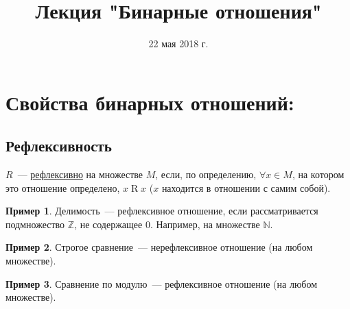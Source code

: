 \documentclass[russian]{lecture-notes}
\title{Лекция "Бинарные отношения"}
\date{22 мая 2018 г.}
\theoremstyle{definition}
\newtheorem{example*}{Пример}[subsection]
\newcommand{\relation}[2]{$#1\mathrel{R}#2$}
\begin{document}
	\maketitle


\section{Свойства бинарных отношений:}

\subsection{Рефлексивность \label{opr:refleks}}
\begin{definition} 
	$R$~--- \underline{рефлексивно} на множестве $M$, если, по определению, $\forall x \in M$, на котором это отношение определено, \relation{x}{x} ($x$ находится в отношении с самим собой).
\end{definition}

\begin{example*}
	Делимость~--- рефлексивное отношение, если рассматривается подмножество $\mathbb{Z}$, не содержащее 0. Например, на множестве $\mathbb{N}$.
\end{example*}

\begin{example*}
	Строгое сравнение~--- нерефлексивное отношение (на любом множестве).
\end{example*}

\begin{example*}
	Сравнение по модулю~--- рефлексивное отношение (на любом множестве).
\end{example*}
\end{document}
